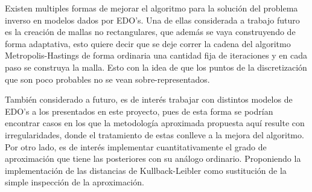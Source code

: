 Existen multiples formas de mejorar el algoritmo para la solución del problema inverso en modelos dados por EDO's. Una de ellas considerada a trabajo futuro es la creación de mallas no rectangulares, que además se vaya construyendo de forma adaptativa, esto quiere decir que se deje correr la cadena del algoritmo Metropolis-Hastings de forma ordinaria una cantidad fija de iteraciones y en cada paso se construya la malla. Esto con la idea de que los puntos de la discretización que son poco probables no se vean sobre-representados.

También considerado a futuro, es de interés trabajar con distintos modelos de EDO's a los presentados en este proyecto, pues de esta forma se podrían encontrar casos en los que la metodología aproximada propuesta aquí resulte con irregularidades, donde el tratamiento de estas conlleve a la mejora del algoritmo. Por otro lado, es de interés implementar cuantitativamente el grado de aproximación que tiene las posteriores con su análogo ordinario. Proponiendo la implementación de las distancias de Kullback-Leibler como sustitución de la simple inspección de la aproximación.
